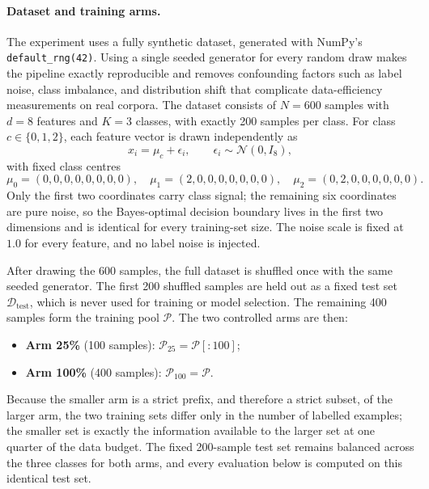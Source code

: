 \documentclass{article}
\begin{document}
\paragraph{Dataset and training arms.}
The experiment uses a fully synthetic dataset, generated with NumPy's \texttt{default\_rng(42)}. Using a single seeded generator for every random draw makes the pipeline exactly reproducible and removes confounding factors such as label noise, class imbalance, and distribution shift that complicate data-efficiency measurements on real corpora. The dataset consists of \(N = 600\) samples with \(d = 8\) features and \(K = 3\) classes, with exactly 200 samples per class. For class \(c \in \{0,1,2\}\), each feature vector is drawn independently as
\begin{equation}
x_i = \mu_c + \epsilon_i, \qquad \epsilon_i \sim \mathcal{N}(0, I_8),
\end{equation}
with fixed class centres
\begin{equation}
\mu_0 = (0,0,0,0,0,0,0,0), \quad
\mu_1 = (2,0,0,0,0,0,0,0), \quad
\mu_2 = (0,2,0,0,0,0,0,0).
\end{equation}
Only the first two coordinates carry class signal; the remaining six coordinates are pure noise, so the Bayes-optimal decision boundary lives in the first two dimensions and is identical for every training-set size. The noise scale is fixed at \(1.0\) for every feature, and no label noise is injected.

After drawing the 600 samples, the full dataset is shuffled once with the same seeded generator. The first 200 shuffled samples are held out as a fixed test set \(\mathcal{D}_{\text{test}}\), which is never used for training or model selection. The remaining 400 samples form the training pool \(\mathcal{P}\). The two controlled arms are then:
\begin{itemize}
    \item \textbf{Arm 25\%} (100 samples): \(\mathcal{P}_{25} = \mathcal{P}[:100]\);
    \item \textbf{Arm 100\%} (400 samples): \(\mathcal{P}_{100} = \mathcal{P}\).
\end{itemize}
Because the smaller arm is a strict prefix, and therefore a strict subset, of the larger arm, the two training sets differ only in the number of labelled examples; the smaller set is exactly the information available to the larger set at one quarter of the data budget. The fixed 200-sample test set remains balanced across the three classes for both arms, and every evaluation below is computed on this identical test set.
\end{document}
